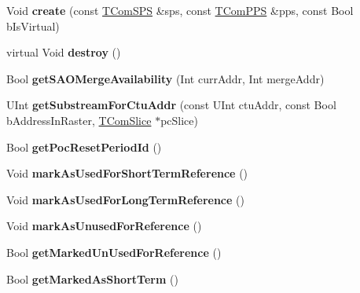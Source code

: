\begin{DoxyCompactItemize}
\item 
\mbox{\label{class_t_com_pic_a513397a59d2fe225ca877f2bcbfce941}} 
Void {\bfseries create} (const \hyperlink{class_t_com_s_p_s}{T\+Com\+S\+PS} \&sps, const \hyperlink{class_t_com_p_p_s}{T\+Com\+P\+PS} \&pps, const Bool b\+Is\+Virtual)
\item 
\mbox{\label{class_t_com_pic_a1c8beb5b24400d6e6f4064f3f906b26e}} 
virtual Void {\bfseries destroy} ()
\item 
\mbox{\label{class_t_com_pic_a97f69be783c0aead90dbe59360c6e8bf}} 
Bool {\bfseries get\+S\+A\+O\+Merge\+Availability} (Int curr\+Addr, Int merge\+Addr)
\item 
\mbox{\label{class_t_com_pic_a9f9f754a802199c024a4f135e842c25a}} 
U\+Int {\bfseries get\+Substream\+For\+Ctu\+Addr} (const U\+Int ctu\+Addr, const Bool b\+Address\+In\+Raster, \hyperlink{class_t_com_slice}{T\+Com\+Slice} $\ast$pc\+Slice)
\item 
\mbox{\label{class_t_com_pic_a3529b68f5ae40afee1fa50007296dd39}} 
Bool {\bfseries get\+Poc\+Reset\+Period\+Id} ()
\item 
\mbox{\label{class_t_com_pic_a5ee74f34792d69c14e77f6891218be00}} 
Void {\bfseries mark\+As\+Used\+For\+Short\+Term\+Reference} ()
\item 
\mbox{\label{class_t_com_pic_a36dc788fcd9b5a4b1fdf3a6d681b8eef}} 
Void {\bfseries mark\+As\+Used\+For\+Long\+Term\+Reference} ()
\item 
\mbox{\label{class_t_com_pic_ad9ac7b43f7339c3647738cd672386877}} 
Void {\bfseries mark\+As\+Unused\+For\+Reference} ()
\item 
\mbox{\label{class_t_com_pic_a3a23c4ff1981d14ad604b845a1fe586c}} 
Bool {\bfseries get\+Marked\+Un\+Used\+For\+Reference} ()
\item 
\mbox{\label{class_t_com_pic_a30fb85adfbecd2c770a41f5e34361286}} 
Bool {\bfseries get\+Marked\+As\+Short\+Term} ()

\end{DoxyCompactItemize}
